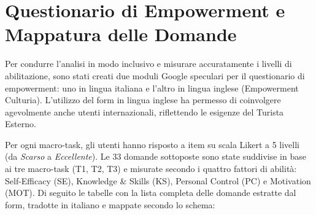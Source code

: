 \section{Questionario di Empowerment e Mappatura delle Domande}

Per condurre l'analisi in modo inclusivo e misurare accuratamente i livelli di abilitazione, sono stati creati due moduli Google speculari per il questionario di empowerment: uno in lingua italiana e l'altro in lingua inglese (Empowerment Culturia). L'utilizzo del form in lingua inglese ha permesso di coinvolgere agevolmente anche utenti internazionali, riflettendo le esigenze del Turista Esterno.

Per ogni macro-task, gli utenti hanno risposto a item su scala Likert a 5 livelli (da \textit{Scarso} a \textit{Eccellente}). Le 33 domande sottoposte sono state suddivise in base ai tre macro-task (T1, T2, T3) e misurate secondo i quattro fattori di abilità: Self-Efficacy (SE), Knowledge \& Skills (KS), Personal Control (PC) e Motivation (MOT). Di seguito le tabelle con la lista completa delle domande estratte dal form, tradotte in italiano e mappate secondo lo schema:

